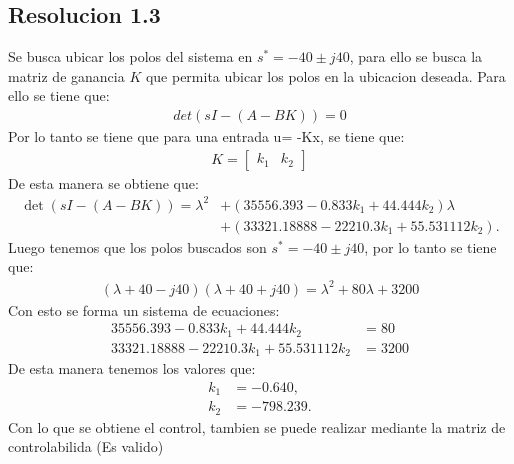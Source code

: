\documentclass[
  11pt,
  letterpaper,
   addpoints,
   answers
  ]{exam}
\begin{document}
\begin{questions}
\begin{solution}
    \subsection{Resolucion 1.3}
    Se busca ubicar los polos del sistema en $s^{*} = -40 \pm j40$, para ello se busca la matriz de ganancia $K$ que permita ubicar los polos en la ubicacion deseada. Para ello se tiene que:
    \begin{align}
        det(sI - (A - BK)) = 0
    \end{align}
    Por lo tanto se tiene que para una entrada u= -Kx, se tiene que:
    \begin{align}
        K = \begin{bmatrix}
            k_{1} & k_{2}
        \end{bmatrix}
    \end{align}
    De esta manera se obtiene que:
    \begin{align}
        \det(sI - (A - BK)) = \lambda^2 &+ (35556.393 - 0.833k_1 + 44.444k_2)\lambda \\
        &+ (33321.18888 - 22210.3k_1 + 55.531112k_2).
    \end{align}
    Luego tenemos que los polos buscados son $s^{*} = -40 \pm j40$, por lo tanto se tiene que:
    \begin{align}
        (\lambda + 40 - j40)(\lambda + 40 + j40) = \lambda^2 + 80\lambda + 3200
    \end{align}
    Con esto se forma un sistema de ecuaciones:
    \begin{align}
        35556.393 - 0.833k_1 + 44.444k_2 &= 80\\ 
        33321.18888 - 22210.3k_1 + 55.531112k_2 &= 3200
    \end{align}
    De esta manera tenemos los valores que:
    \begin{align}
        k_1 &= -0.640, \\
        k_2 &= -798.239.
    \end{align}
    Con lo que se obtiene el control, tambien se puede realizar mediante la matriz de controlabilida (Es valido)

\end{solution}
\end{questions}
\end{document}

